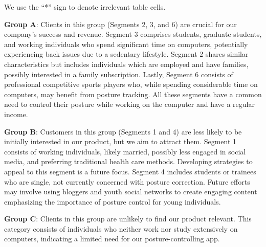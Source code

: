 We use the “*” sign to denote irrelevant table cells.

\p
\textbf{Group A}: Clients in this group (Segments 2, 3, and 6) are crucial for our company's success and revenue. Segment 3 comprises students, graduate students, and working individuals who spend significant time on computers, potentially experiencing back issues due to a sedentary lifestyle. Segment 2 shares similar characteristics but includes individuals which are employed and have families, possibly interested in a family subscription. Lastly, Segment 6 consists of professional competitive sports players who, while spending considerable time on computers, may benefit from posture tracking. All these segments have a common need to control their posture while working on the computer and have a regular income.

\p
\textbf{Group B}: Customers in this group (Segments 1 and 4) are less likely to be initially interested in our product, but we aim to attract them. Segment 1 consists of working individuals, likely married, possibly less engaged in social media, and preferring traditional health care methods. Developing strategies to appeal to this segment is a future focus. Segment 4 includes students or trainees who are single, not currently concerned with posture correction. Future efforts may involve using bloggers and youth social networks to create engaging content emphasizing the importance of posture control for young individuals.

\p
\textbf{Group C}: Clients in this group are unlikely to find our product relevant. This category consists of individuals who neither work nor study extensively on computers, indicating a limited need for our posture-controlling app.






